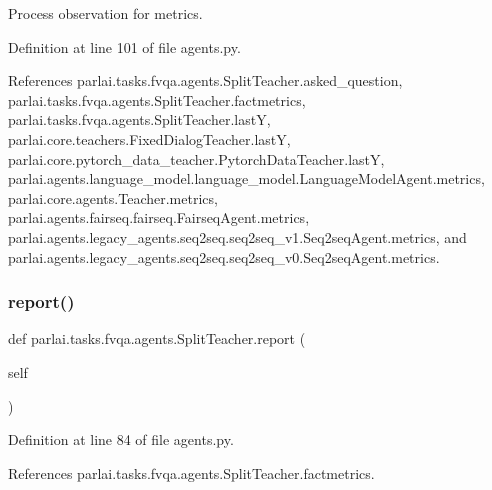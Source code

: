 \begin{DoxyVerb}Process observation for metrics.\end{DoxyVerb}
 

Definition at line 101 of file agents.\+py.



References parlai.\+tasks.\+fvqa.\+agents.\+Split\+Teacher.\+asked\+\_\+question, parlai.\+tasks.\+fvqa.\+agents.\+Split\+Teacher.\+factmetrics, parlai.\+tasks.\+fvqa.\+agents.\+Split\+Teacher.\+lastY, parlai.\+core.\+teachers.\+Fixed\+Dialog\+Teacher.\+lastY, parlai.\+core.\+pytorch\+\_\+data\+\_\+teacher.\+Pytorch\+Data\+Teacher.\+lastY, parlai.\+agents.\+language\+\_\+model.\+language\+\_\+model.\+Language\+Model\+Agent.\+metrics, parlai.\+core.\+agents.\+Teacher.\+metrics, parlai.\+agents.\+fairseq.\+fairseq.\+Fairseq\+Agent.\+metrics, parlai.\+agents.\+legacy\+\_\+agents.\+seq2seq.\+seq2seq\+\_\+v1.\+Seq2seq\+Agent.\+metrics, and parlai.\+agents.\+legacy\+\_\+agents.\+seq2seq.\+seq2seq\+\_\+v0.\+Seq2seq\+Agent.\+metrics.

\mbox{\label{classparlai_1_1tasks_1_1fvqa_1_1agents_1_1SplitTeacher_a1dd97916b9ebfa15118857af24da682a}} 
\subsubsection{\texorpdfstring{report()}{report()}}
{\footnotesize\ttfamily def parlai.\+tasks.\+fvqa.\+agents.\+Split\+Teacher.\+report (\begin{DoxyParamCaption}\item[{}]{self }\end{DoxyParamCaption})}



Definition at line 84 of file agents.\+py.



References parlai.\+tasks.\+fvqa.\+agents.\+Split\+Teacher.\+factmetrics.

\mbox{\label{classparlai_1_1tasks_1_1fvqa_1_1agents_1_1SplitTeacher_a182054c66ca15095740b9c03dad2a4b9}} 
